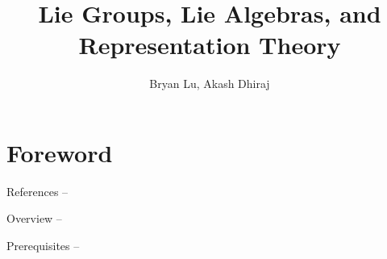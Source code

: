 \documentclass[12pt, nodate]{scrartcl}
\title{Lie Groups, Lie Algebras, and Representation Theory}
\author{Bryan Lu, Akash Dhiraj}
\begin{document}
\maketitle

\setcounter{section}{-1}
\section{Foreword}
References --

Overview --

Prerequisites --

\pagebreak


\end{document}
